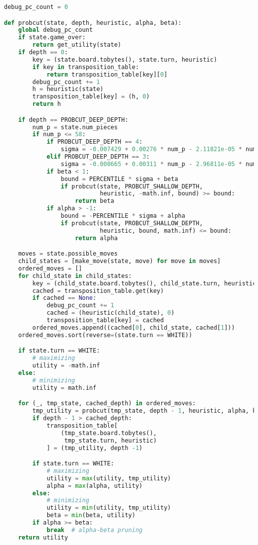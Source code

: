 \begin{lstlisting}[language=Python]
debug_pc_count = 0

def probcut(state, depth, heuristic, alpha, beta):
    global debug_pc_count
    if state.game_over:
        return get_utility(state)
    if depth == 0:
        key = (state.board.tobytes(), state.turn, heuristic)
        if key in transposition_table:
            return transposition_table[key][0]
        debug_pc_count += 1
        h = heuristic(state)
        transposition_table[key] = (h, 0)
        return h

    if depth == PROBCUT_DEEP_DEPTH:
        num_p = state.num_pieces
        if num_p <= 58:
            if PROBCUT_DEEP_DEPTH == 4:
                sigma = -0.007429 + 0.00276 * num_p - 2.11821e-05 * num_p**2
            elif PROBCUT_DEEP_DEPTH == 3:
                sigma = -0.008665 + 0.00311 * num_p - 2.96811e-05 * num_p**2
            if beta < 1:
                bound = PERCENTILE * sigma + beta
                if probcut(state, PROBCUT_SHALLOW_DEPTH,
                           heuristic, -math.inf, bound) >= bound:
                    return beta
            if alpha > -1:
                bound = -PERCENTILE * sigma + alpha
                if probcut(state, PROBCUT_SHALLOW_DEPTH,
                           heuristic, bound, math.inf) <= bound:
                    return alpha

    moves = state.possible_moves
    child_states = [make_move(state, move) for move in moves]
    ordered_moves = []
    for child_state in child_states:
        key = (child_state.board.tobytes(), child_state.turn, heuristic)
        cached = transposition_table.get(key)
        if cached == None:
            debug_pc_count += 1
            cached = (heuristic(child_state), 0)
            transposition_table[key] = cached
        ordered_moves.append((cached[0], child_state, cached[1]))
    ordered_moves.sort(reverse=(state.turn == WHITE))

    if state.turn == WHITE:
        # maximizing
        utility = -math.inf
    else:
        # minimizing
        utility = math.inf

    for (_, tmp_state, cached_depth) in ordered_moves:
        tmp_utility = probcut(tmp_state, depth - 1, heuristic, alpha, beta)
        if depth - 1 > cached_depth:
            transposition_table[
                (tmp_state.board.tobytes(),
                 tmp_state.turn, heuristic)
            ] = (tmp_utility, depth -1)

        if state.turn == WHITE:
            # maximizing
            utility = max(utility, tmp_utility)
            alpha = max(alpha, utility)
        else:
            # minimizing
            utility = min(utility, tmp_utility)
            beta = min(beta, utility)
        if alpha >= beta:
            break  # alpha-beta pruning
    return utility
\end{lstlisting}

